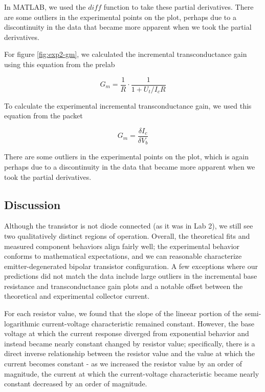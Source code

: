 \documentclass{article}
\begin{document}
In MATLAB, we used the $diff$ function to take these partial derivatives. 
There are some outliers in the experimental points on the plot, perhaps due to a discontinuity in the data that became more apparent when we took the partial derivatives. 

\newline

For figure \ref{fig:exp2-gm}, we calculated the incremental transconductance gain using this equation from the prelab

\begin{centering}
$$G_m = \frac{1}{R} \cdot \frac{1}{1 + U_t / I_c R}$$
\end{centering}

To calculate the experimental incremental transconductance gain, we used this equation from the packet

\begin{centering}
$$G_m = \frac{\delta I_c}{\delta V_b}$$
\end{centering}

There are some outliers in the experimental points on the plot, which is again perhaps due to a discontinuity in the data that became more apparent when we took the partial derivatives. 


\subsection{Discussion}
Although the transistor is not diode connected (as it was in Lab 2), we still see two qualitatively distinct regions of operation. Overall, the theoretical fits and measured component behaviors align fairly well; the experimental behavior conforms to mathematical expectations, and we can reasonable characterize emitter-degenerated bipolar transistor configuration. A few exceptions where our predictions did not match the data include large outliers in the incremental base resistance and transconductance gain plots and a notable offset between the theoretical and experimental collector current. 

For each resistor value, we found that the slope of the lineear portion of the semi-logarithmic current-voltage characteristic remained constant. However, the base voltage at which the current response diverged from exponential behavior and instead became nearly constant changed by resistor value; specifically, there is a direct inverse relationship between the resistor value and the value at which the current becomes constant - as we increased the resistor value by an order of magnitude, the current at which the current-voltage characteristic became nearly constant decreased by an order of magnitude.
\end{document}
